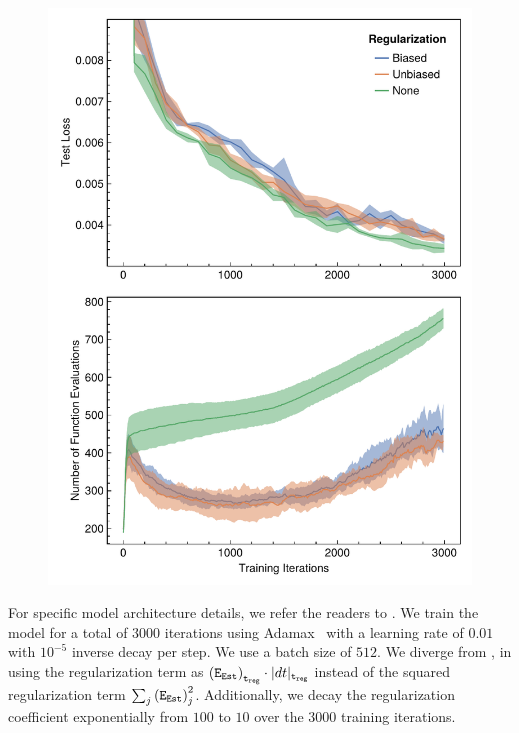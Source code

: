 \begin{figure}
  \centering
  \includegraphics[width=\linewidth]{../figures/local_regularizing_neural_des/physionet.pdf}
  \label{fig:physionet_localreg}
\end{figure}

For specific model architecture details, we refer the readers to \citet{pal2021opening}. We train the model for a total of $3000$ iterations using Adamax~\citep{kingma2017adam} with a learning rate of $0.01$ with $10^{-5}$ inverse decay per step. We use a batch size of $512$. We diverge from \citet{pal2021opening}, in using the regularization term as $\left(\texttt{E}_{\texttt{Est}}\right)_{\texttt{t}_{\texttt{reg}}} \cdot |dt|_{\texttt{t}_{\texttt{reg}}}$ instead of the squared regularization term $\sum_j \left(\texttt{E}_{\texttt{Est}}\right)_j^2$. Additionally, we decay the regularization coefficient exponentially from $100$ to $10$ over the $3000$ training iterations.


